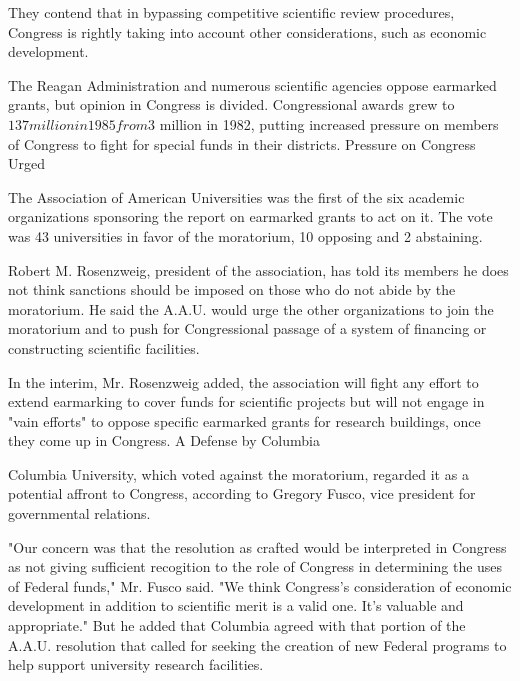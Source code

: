 \documentclass{article}
\begin{document}
They contend that in bypassing competitive scientific review procedures, Congress is rightly taking into account other considerations, such as economic development.

The Reagan Administration and numerous scientific agencies oppose earmarked grants, but opinion in Congress is divided. Congressional awards grew to $137 million in 1985 from $3 million in 1982, putting increased pressure on members of Congress to fight for special funds in their districts. Pressure on Congress Urged

The Association of American Universities was the first of the six academic organizations sponsoring the report on earmarked grants to act on it. The vote was 43 universities in favor of the moratorium, 10 opposing and 2 abstaining.

Robert M. Rosenzweig, president of the association, has told its members he does not think sanctions should be imposed on those who do not abide by the moratorium. He said the A.A.U. would urge the other organizations to join the moratorium and to push for Congressional passage of a system of financing or constructing scientific facilities.

In the interim, Mr. Rosenzweig added, the association will fight any effort to extend earmarking to cover funds for scientific projects but will not engage in "vain efforts" to oppose specific earmarked grants for research buildings, once they come up in Congress. A Defense by Columbia

Columbia University, which voted against the moratorium, regarded it as a potential affront to Congress, according to Gregory Fusco, vice president for governmental relations.

"Our concern was that the resolution as crafted would be interpreted in Congress as not giving sufficient recogition to the role of Congress in determining the uses of Federal funds," Mr. Fusco said. "We think Congress's consideration of economic development in addition to scientific merit is a valid one. It's valuable and appropriate." But he added that Columbia agreed with that portion of the A.A.U. resolution that called for seeking the creation of new Federal programs to help support university research facilities.
\end{document}
